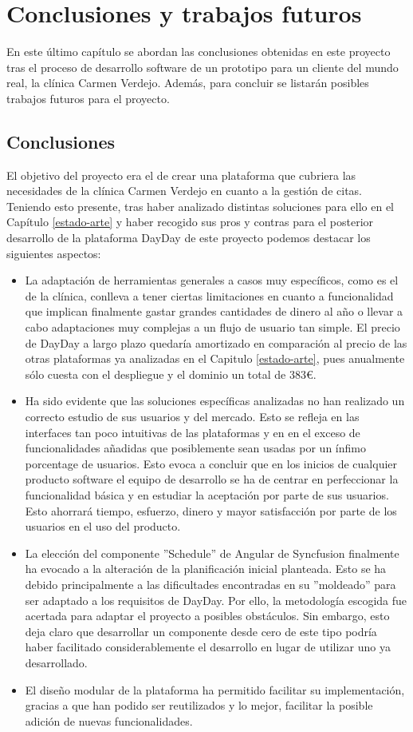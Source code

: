 \chapter{Conclusiones y trabajos futuros}
En este último capítulo se abordan las conclusiones obtenidas en este proyecto tras el proceso de desarrollo software de un prototipo para un cliente del mundo real, la clínica Carmen Verdejo. Además, para concluir se listarán posibles trabajos futuros para el proyecto.

\section{Conclusiones}
El objetivo del proyecto era el de crear una plataforma que cubriera las necesidades de la clínica Carmen Verdejo en cuanto a la gestión de citas. Teniendo esto presente, tras haber analizado distintas soluciones para ello en el Capítulo \ref{estado-arte} y haber recogido sus pros y contras para el posterior desarrollo de la plataforma DayDay de este proyecto podemos destacar los siguientes aspectos:

\begin{itemize}
    \item La adaptación de herramientas generales a casos muy específicos, como es el de la clínica, conlleva a tener ciertas limitaciones en cuanto a funcionalidad que implican finalmente gastar grandes cantidades de dinero al año o llevar a cabo adaptaciones muy complejas a un flujo de usuario tan simple. El precio de DayDay a largo plazo quedaría amortizado en comparación al precio de las otras plataformas ya analizadas en el Capitulo \ref{estado-arte}, pues anualmente sólo cuesta con el despliegue y el dominio un total de 383€.
    \item Ha sido evidente que las soluciones específicas analizadas no han realizado un correcto estudio de sus usuarios y del mercado. Esto se refleja en las interfaces tan poco intuitivas de las plataformas y en en el exceso de funcionalidades añadidas que posiblemente sean usadas por un ínfimo porcentage de usuarios. Esto evoca a concluir que en los inicios de cualquier producto software el equipo de desarrollo se ha de centrar en perfeccionar la funcionalidad básica y en estudiar la aceptación por parte de sus usuarios. Esto ahorrará tiempo, esfuerzo, dinero y mayor satisfacción por parte de los usuarios en el uso del producto.
    \item La elección del componente ''Schedule'' de Angular de Syncfusion finalmente ha evocado a la alteración de la planificación inicial planteada. Esto se ha debido principalmente a las dificultades encontradas en su ''moldeado'' para ser adaptado a los requisitos de DayDay. Por ello, la metodología escogida fue acertada para adaptar el proyecto a posibles obstáculos. Sin embargo, esto deja claro que desarrollar un componente desde cero de este tipo podría haber facilitado considerablemente el desarrollo en lugar de utilizar uno ya desarrollado.
    \item El diseño modular de la plataforma ha permitido facilitar su implementación, gracias a que han podido ser reutilizados y lo mejor, facilitar la posible adición de nuevas funcionalidades.
\end{itemize}


